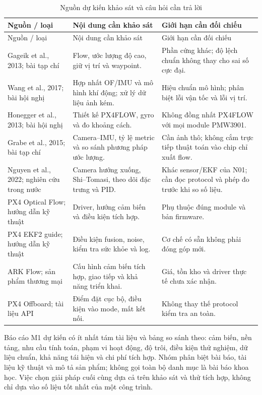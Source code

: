 \documentclass[a4paper,12pt]{article}
\newcommand{\tblfont}{\fontsize{11.5}{14}\selectfont\setstretch{1.08}}
\begin{document}
\begingroup\tblfont
\begin{longtable}{L{4.1cm}L{5.1cm}L{4.5cm}}
\caption{Nguồn dự kiến khảo sát và câu hỏi cần trả lời}\label{tab:lit}\\
\toprule Nguồn / loại & Nội dung cần khảo sát & Giới hạn cần đối chiếu\\\midrule\endfirsthead
\toprule Nguồn / loại & Nội dung cần khảo sát & Giới hạn cần đối chiếu\\\midrule\endhead
Gageik et al., 2013\cite{gageik}; bài tạp chí & Flow, ước lượng độ cao, giữ vị trí và waypoint. & Phần cứng khác; độ lệch chuẩn không thay cho sai số cực đại.\\
Wang et al., 2017\cite{wang}; bài hội nghị & Hợp nhất OF/IMU và mô hình khí động; xử lý dữ liệu ảnh kém. & Hiệu chuẩn mô hình; phân biệt lỗi vận tốc và lỗi vị trí.\\
Honegger et al., 2013\cite{honegger}; bài hội nghị & Thiết kế PX4FLOW, gyro và đo khoảng cách. & Không đồng nhất PX4FLOW với mọi module PMW3901.\\
Grabe et al., 2015\cite{grabe}; bài tạp chí & Camera–IMU, tỷ lệ metric và so sánh phương pháp ước lượng. & Cần ảnh thô; không cắm trực tiếp thuật toán vào chip chỉ xuất flow.\\
Nguyen et al., 2022\cite{vn}; nghiên cứu trong nước & Camera hướng xuống, Shi–Tomasi, theo dõi đặc trưng và PID. & Khác sensor/EKF của N01; cần đọc protocol và phép đo trước khi so số liệu.\\
PX4 Optical Flow\cite{flow}; hướng dẫn kỹ thuật & Driver, hướng cảm biến và điều kiện tích hợp. & Phụ thuộc đúng module và bản firmware.\\
PX4 EKF2 guide\cite{ekf}; hướng dẫn kỹ thuật & Điều kiện fusion, noise, kiểm tra sức khỏe và log. & Cơ chế có sẵn không phải đóng góp mới.\\
ARK Flow\cite{ark}; sản phẩm thương mại & Cấu hình cảm biến tích hợp, giao tiếp và khả năng triển khai. & Giá, tồn kho và driver thực tế chưa xác nhận.\\
PX4 Offboard\cite{offboard}; tài liệu API & Điểm đặt cục bộ, điều kiện vào mode, mất kết nối. & Không thay thế protocol kiểm tra an toàn.\\
\bottomrule
\end{longtable}\endgroup

Báo cáo M1 dự kiến có ít nhất tám tài liệu và bảng so sánh theo: cảm biến, nền tảng, nhu cầu tính toán, phạm vi hoạt động, độ trôi, điều kiện thử nghiệm, dữ liệu chuẩn, khả năng tái hiện và chi phí tích hợp. Nhóm phân biệt bài báo, tài liệu kỹ thuật và mô tả sản phẩm; không gọi toàn bộ danh mục là bài báo khoa học. Việc chọn giải pháp cuối cùng dựa cả trên khảo sát và thử tích hợp, không chỉ dựa vào số liệu tốt nhất của một công trình.
\end{document}
